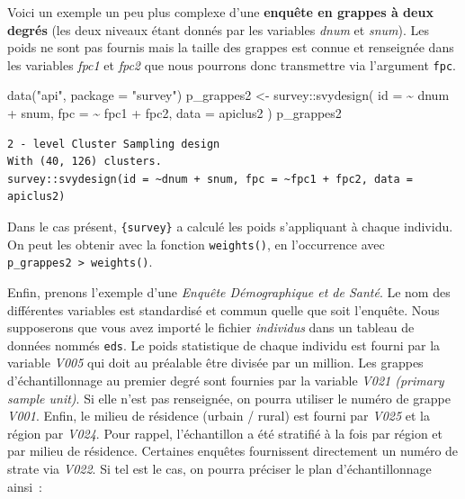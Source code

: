 \documentclass[
  letterpaper,
  DIV=11,
  numbers=noendperiod,
  oneside]{scrreprt}
\newenvironment{Shaded}{\begin{snugshade}}{\end{snugshade}}
\newcommand{\AttributeTok}[1]{\textcolor[rgb]{0.40,0.45,0.13}{#1}}
\newcommand{\FunctionTok}[1]{\textcolor[rgb]{0.28,0.35,0.67}{#1}}
\newcommand{\NormalTok}[1]{\textcolor[rgb]{0.00,0.23,0.31}{#1}}
\newcommand{\OtherTok}[1]{\textcolor[rgb]{0.00,0.23,0.31}{#1}}
\newcommand{\SpecialCharTok}[1]{\textcolor[rgb]{0.37,0.37,0.37}{#1}}
\newcommand{\StringTok}[1]{\textcolor[rgb]{0.13,0.47,0.30}{#1}}
\begin{document}
Voici un exemple un peu plus complexe d'une \textbf{enquête en grappes à
deux degrés} (les deux niveaux étant donnés par les variables
\emph{dnum} et \emph{snum}). Les poids ne sont pas fournis mais la
taille des grappes est connue et renseignée dans les variables
\emph{fpc1} et \emph{fpc2} que nous pourrons donc transmettre via
l'argument \texttt{fpc}.

\begin{Shaded}
\begin{Highlighting}[]
\FunctionTok{data}\NormalTok{(}\StringTok{"api"}\NormalTok{, }\AttributeTok{package =} \StringTok{"survey"}\NormalTok{)}
\NormalTok{p\_grappes2 }\OtherTok{\textless{}{-}}\NormalTok{ survey}\SpecialCharTok{::}\FunctionTok{svydesign}\NormalTok{(}
  \AttributeTok{id =} \SpecialCharTok{\textasciitilde{}}\NormalTok{ dnum }\SpecialCharTok{+}\NormalTok{ snum,}
  \AttributeTok{fpc =} \SpecialCharTok{\textasciitilde{}}\NormalTok{ fpc1 }\SpecialCharTok{+}\NormalTok{ fpc2,}
  \AttributeTok{data =}\NormalTok{ apiclus2}
\NormalTok{)}
\NormalTok{p\_grappes2}
\end{Highlighting}
\end{Shaded}

\begin{verbatim}
2 - level Cluster Sampling design
With (40, 126) clusters.
survey::svydesign(id = ~dnum + snum, fpc = ~fpc1 + fpc2, data = apiclus2)
\end{verbatim}

Dans le cas présent, \texttt{\{survey\}} a calculé les poids
s'appliquant à chaque individu. On peut les obtenir avec la fonction
\texttt{weights()}, en l'occurrence avec
\texttt{p\_grappes2\ \textbar{}\textgreater{}\ weights()}.

Enfin, prenons l'exemple d'une \emph{Enquête Démographique et de Santé}.
Le nom des différentes variables est standardisé et commun quelle que
soit l'enquête. Nous supposerons que vous avez importé le fichier
\emph{individus} dans un tableau de données nommés \texttt{eds}. Le
poids statistique de chaque individu est fourni par la variable
\emph{V005} qui doit au préalable être divisée par un million. Les
grappes d'échantillonnage au premier degré sont fournies par la variable
\emph{V021 (primary sample unit)}. Si elle n'est pas renseignée, on
pourra utiliser le numéro de grappe \emph{V001}. Enfin, le milieu de
résidence (urbain / rural) est fourni par \emph{V025} et la région par
\emph{V024}. Pour rappel, l'échantillon a été stratifié à la fois par
région et par milieu de résidence. Certaines enquêtes fournissent
directement un numéro de strate via \emph{V022}. Si tel est le cas, on
pourra préciser le plan d'échantillonnage ainsi~:
\end{document}

